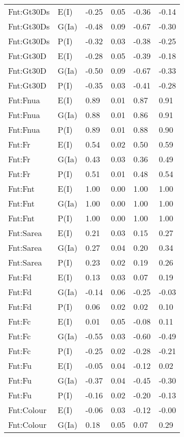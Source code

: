 \begin{center}
\begin{longtable}{|p{1.1in}|p{0.7in}|p{0.7in}|p{0.6in}|p{0.6in}|p{0.6in}|}
  Fnt:Gt30Ds & E(I) & -0.25 & 0.05 & -0.36 & -0.14 \\ 
  Fnt:Gt30Ds & G(Ia) & -0.48 & 0.09 & -0.67 & -0.30 \\ 
  Fnt:Gt30Ds & P(I) & -0.32 & 0.03 & -0.38 & -0.25 \\ 
  Fnt:Gt30D & E(I) & -0.28 & 0.05 & -0.39 & -0.18 \\ 
  Fnt:Gt30D & G(Ia) & -0.50 & 0.09 & -0.67 & -0.33 \\ 
  Fnt:Gt30D & P(I) & -0.35 & 0.03 & -0.41 & -0.28 \\ 
  Fnt:Fnua & E(I) & 0.89 & 0.01 & 0.87 & 0.91 \\ 
  Fnt:Fnua & G(Ia) & 0.88 & 0.01 & 0.86 & 0.91 \\ 
  Fnt:Fnua & P(I) & 0.89 & 0.01 & 0.88 & 0.90 \\ 
  Fnt:Fr & E(I) & 0.54 & 0.02 & 0.50 & 0.59 \\ 
  Fnt:Fr & G(Ia) & 0.43 & 0.03 & 0.36 & 0.49 \\ 
  Fnt:Fr & P(I) & 0.51 & 0.01 & 0.48 & 0.54 \\ 
  Fnt:Fnt & E(I) & 1.00 & 0.00 & 1.00 & 1.00 \\ 
  Fnt:Fnt & G(Ia) & 1.00 & 0.00 & 1.00 & 1.00 \\ 
  Fnt:Fnt & P(I) & 1.00 & 0.00 & 1.00 & 1.00 \\ 
  Fnt:Sarea & E(I) & 0.21 & 0.03 & 0.15 & 0.27 \\ 
  Fnt:Sarea & G(Ia) & 0.27 & 0.04 & 0.20 & 0.34 \\ 
  Fnt:Sarea & P(I) & 0.23 & 0.02 & 0.19 & 0.26 \\ 
  Fnt:Fd & E(I) & 0.13 & 0.03 & 0.07 & 0.19 \\ 
  Fnt:Fd & G(Ia) & -0.14 & 0.06 & -0.25 & -0.03 \\ 
  Fnt:Fd & P(I) & 0.06 & 0.02 & 0.02 & 0.10 \\ 
  Fnt:Fc & E(I) & 0.01 & 0.05 & -0.08 & 0.11 \\ 
  Fnt:Fc & G(Ia) & -0.55 & 0.03 & -0.60 & -0.49 \\ 
  Fnt:Fc & P(I) & -0.25 & 0.02 & -0.28 & -0.21 \\ 
  Fnt:Fu & E(I) & -0.05 & 0.04 & -0.12 & 0.02 \\ 
  Fnt:Fu & G(Ia) & -0.37 & 0.04 & -0.45 & -0.30 \\ 
  Fnt:Fu & P(I) & -0.16 & 0.02 & -0.20 & -0.13 \\ 
  Fnt:Colour & E(I) & -0.06 & 0.03 & -0.12 & -0.00 \\ 
  Fnt:Colour & G(Ia) & 0.18 & 0.05 & 0.07 & 0.29 \\ 

\end{longtable}
\end{center}
